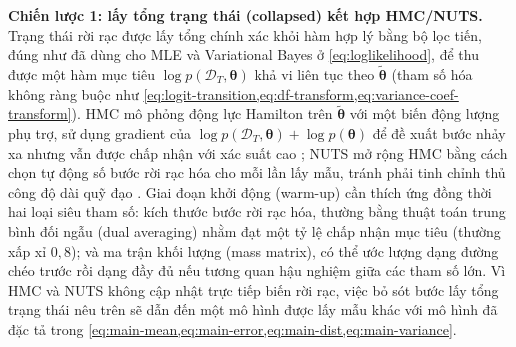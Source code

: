 \documentclass[12pt,a4paper]{article}
\numberwithin{equation}{section}
\newcommand{\bm}[1]{\symbf{#1}}
\newcommand{\Data}{\mathcal{D}}
\newcommand{\Param}{\bm{\theta}}
\begin{document}
\textbf{Chiến lược 1: lấy tổng trạng thái (collapsed) kết hợp HMC/NUTS.} Trạng thái rời rạc được lấy tổng chính xác khỏi hàm hợp lý bằng bộ lọc tiến, đúng như đã dùng cho MLE và Variational Bayes ở \cref{eq:loglikelihood}, để thu được một hàm mục tiêu $\log p(\Data_T,\Param)$ khả vi liên tục theo $\widetilde{\Param}$ (tham số hóa không ràng buộc như \cref{eq:logit-transition,eq:df-transform,eq:variance-coef-transform}). HMC mô phỏng động lực Hamilton trên $\widetilde{\Param}$ với một biến động lượng phụ trợ, sử dụng gradient của $\log p(\Data_T,\Param)+\log p(\Param)$ để đề xuất bước nhảy xa nhưng vẫn được chấp nhận với xác suất cao \cite{neal2011}; NUTS mở rộng HMC bằng cách chọn tự động số bước rời rạc hóa cho mỗi lần lấy mẫu, tránh phải tinh chỉnh thủ công độ dài quỹ đạo \cite{hoffman2014}. Giai đoạn khởi động (warm-up) cần thích ứng đồng thời hai loại siêu tham số: kích thước bước rời rạc hóa, thường bằng thuật toán trung bình đối ngẫu (dual averaging) nhằm đạt một tỷ lệ chấp nhận mục tiêu (thường xấp xỉ $0{,}8$); và ma trận khối lượng (mass matrix), có thể ước lượng dạng đường chéo trước rồi dạng đầy đủ nếu tương quan hậu nghiệm giữa các tham số lớn. Vì HMC và NUTS không cập nhật trực tiếp biến rời rạc, việc bỏ sót bước lấy tổng trạng thái nêu trên sẽ dẫn đến một mô hình được lấy mẫu khác với mô hình đã đặc tả trong \cref{eq:main-mean,eq:main-error,eq:main-dist,eq:main-variance}.
\end{document}
